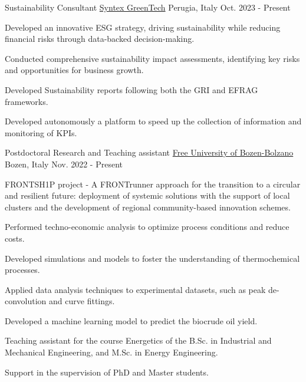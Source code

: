 

\begin{cventries}

  \cventry
  {Sustainability Consultant} %
  {\href{https://syntegreen.tech}{Syntex GreenTech}} %
  {Perugia, Italy} %
  {Oct. 2023 - Present} %
  {
    \begin{cvitems} %
      \item {Developed an innovative ESG strategy, driving sustainability while reducing financial risks through data-backed decision-making.}
      \item {Conducted comprehensive sustainability impact assessments, identifying key risks and opportunities for business growth.}
      \item {Developed Sustainability reports following both the GRI and EFRAG frameworks.}
      \item {Developed autonomously a platform to speed up the collection of information and monitoring of KPIs.}
    \end{cvitems}
  }

  \cventry
  {Postdoctoral Research and Teaching assistant} %
  {\href{https://unibz.it}{Free University of Bozen-Bolzano}} %
  {Bozen, Italy} %
  {Nov. 2022 - Present} %
  {
    \begin{cvitems} %
      \item {FRONTSH1P project - A FRONTrunner approach for the transition to a circular and resilient future: deployment of systemic solutions with the support of local clusters and the development of regional community-based innovation schemes.}
      \item {Performed techno-economic analysis to optimize process conditions and reduce costs.}
      \item {Developed simulations and models to foster the understanding of thermochemical processes.}
      \item {Applied data analysis techniques to experimental datasets, such as peak de-convolution and curve fittings.}
      \item {Developed a machine learning model to predict the biocrude oil yield.}
      \item {Teaching assistant for the course Energetics of the B.Sc. in Industrial and Mechanical Engineering, and M.Sc. in Energy Engineering.}
      \item {Support in the supervision of PhD and Master students.}
    \end{cvitems}
  }


\end{cventries}
